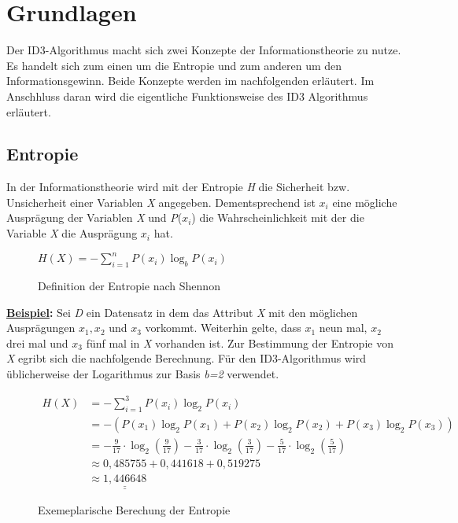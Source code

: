 \section{Grundlagen}
\label{id3:funktionsweise}

Der ID3-Algorithmus macht sich zwei Konzepte der Informationstheorie zu nutze. Es handelt sich zum einen um die Entropie und zum anderen um den Informationsgewinn. Beide Konzepte werden im nachfolgenden erläutert. Im Anschhluss daran wird die eigentliche Funktionsweise des ID3 Algorithmus erläutert.

\subsection{Entropie}
\label{id3:entropie}
In der Informationstheorie wird mit der Entropie \textit{H} die Sicherheit bzw. Unsicherheit  einer Variablen \textit{X} angegeben. Dementsprechend ist $x_{i}$ eine mögliche Ausprägung der Variablen \textit{X} und \textit{P}($x_{i}$) die Wahrscheinlichkeit mit der die Variable \textit{X} die Ausprägung $x_{i}$ hat. \autocite{EntropyClaudeShennon}

\begin{figure}[htbp]
    \vspace{0.5cm}
    \centering
    $ H(X) = - \sum\limits_{i=1}^{n} P(x_{i}) \log_{b} P(x_{i}) $
    \caption{Definition der Entropie nach Shennon\autocite{EntropyClaudeShennon}}
\end{figure}

\textbf{\underline{Beispiel}:} Sei \textit{D} ein Datensatz in dem  das Attribut \textit{X} mit den möglichen Ausprägungen $x_{1}, x_{2}$ und $x_{3}$ vorkommt. Weiterhin gelte, dass $x_{1}$ neun mal, $x_{2}$ drei mal und $x_{3}$ fünf mal in \textit{X} vorhanden ist. Zur Bestimmung der Entropie von \textit{X} egribt sich die nachfolgende Berechnung. Für den ID3-Algorithmus wird üblicherweise der Logarithmus zur Basis \textit{b=2} verwendet. \autocite{ImplementationID3}

\begin{figure}[htbp]
    \centering
    \begin{align*}
         H(X)   &= - \sum\limits_{i=1}^{3} P(x_{i}) \log_{2} P(x_{i})\\
                &= - (P(x_{1}) \log_{2} P(x_{1}) + P(x_{2}) \log_{2} P(x_{2}) + P(x_{3}) \log_{2} P(x_{3}))\\
                &= -\frac{9}{17} \cdot \log_{2} \left(\frac{9}{17}\right) - %
                    \frac{3}{17} \cdot \log_{2} \left(\frac{3}{17}\right) - %
                    \frac{5}{17} \cdot \log_{2} \left(\frac{5}{17}\right)\\
                &\approx 0,485755 + 0,441618 + 0,519275\\
                &\approx \underline{\underline{1,446648}}
    \end{align*}
    \caption{Exemeplarische Berechung der Entropie}
\end{figure}
\pagebreak
